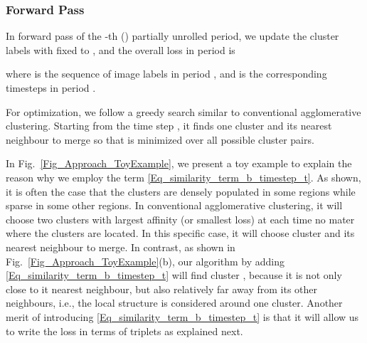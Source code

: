 \documentclass[10pt,twocolumn,letterpaper]{article}
\begin{document}
{{\subsubsection{Forward Pass}
\label{Sec_Forward_Pass}
{In forward pass of the -th () partially unrolled period}, we update the cluster labels {with  fixed to }, and the overall loss in period  is

where  is the sequence of image labels in period , and  is the corresponding timesteps in period .} For optimization, we follow a greedy search {similar to} conventional agglomerative clustering. {Starting from the time step }, it finds one cluster and its nearest neighbour to merge so that  is minimized over all possible cluster pairs.

In Fig.~\ref{Fig_Approach_ToyExample}, we present a toy example to explain the reason why we employ the term \eqref{Eq_similarity_term_b_timestep_t}. As shown, it is often the case that {the clusters are densely populated {in some regions} while sparse in some other regions}. In conventional agglomerative clustering, it will choose two clusters with largest affinity (or smallest loss) at each time no mater where the clusters are located. {In this specific case}, it will choose cluster  and its nearest neighbour to merge. In contrast, as shown in Fig.~\ref{Fig_Approach_ToyExample}(b), our algorithm by adding \eqref{Eq_similarity_term_b_timestep_t} will find cluster , because it is not only close to it nearest neighbour, but also relatively far away from its other neighbours, i.e., the local structure is considered around one cluster. {Another merit of introducing \eqref{Eq_similarity_term_b_timestep_t} is that it will allow us to write the loss in terms of triplets as explained next.}

}
\end{document}
